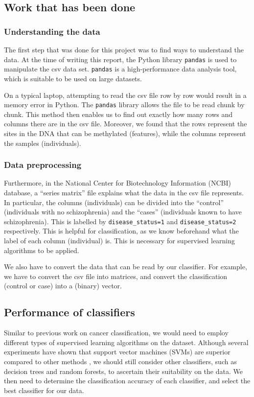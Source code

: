 \documentclass[12pt, twoside, a4paper]{article}
\begin{document}

\subsection{Work that has been done} \label{workDone}
\subsubsection{Understanding the data}
The first step that was done for this project was to find ways to understand the data. At the time of writing this report, the Python library \texttt{pandas} is used to manipulate the csv data set. \texttt{pandas} is a high-performance data analysis tool, which is suitable to be used on large datasets.

On a typical laptop, attempting to read the csv file row by row would result in a memory error in Python. The \texttt{pandas} library allows the file to be read chunk by chunk. This method then enables us to find out exactly how many rows and columns there are in the csv file. Moreover, we found that the rows represent the sites in the DNA that can be methylated (features), while the columns represent the samples (individuals).

\subsubsection{Data preprocessing}
Furthermore, in the National Center for Biotechnology Information (NCBI) database, a ``series matrix'' file  explains what the data in the csv file represents. In particular, the columns (individuals) can be divided into the ``control'' (individuals with no schizophrenia) and the ``cases'' (individuals known to have schizophrenia). This is labelled by \texttt{disease\_status=1} and \texttt{disease\_status=2} respectively. This is helpful for classification, as we know beforehand what the label of each column (individual) is. This is necessary for supervised learning algorithms to be applied.

We also have to convert the data that can be read by our classifier. For example, we have to convert the csv file into matrices, and convert the classification (control or case) into a (binary) vector.

\subsection{Performance of classifiers}
Similar to previous work on cancer classification, we would need to employ different types of supervised learning algorithms on the dataset. Although several experiments have shown that support vector machines (SVMs) are superior compared to other methods \cite{RefWorks:90}, we should still consider other classifiers, such as decision trees and random forests, to ascertain their suitability on the data. We then need to determine the classification accuracy of each classifier, and select the best classifier for our data.
\end{document}
